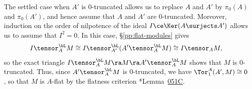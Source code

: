 The settled case when $A'$ is $0$-truncated allows us to replace $A$ and $A'$ by $\pi_0(A)$ and $\pi_0(A')$, and hence assume that $A$ and $A'$ are $0$-truncated. Moreover, induction on the order of nilpotence of the ideal $I \ce \Ker(A \surjects A')$ allows us to assume that $I^2 = 0$. In this case, \S\ref{pp:flat-modules} gives
\[
I \tensor^\bL_A M \cong I \tensor^\bL_{A'} (A' \tensor^\bL_A M) \cong I \tensor_A M,
\]
so the exact triangle $I \tensor^\bL_A M \ra M \ra A' \tensor^\bL_A M$ shows that $M$ is $0$-truncated. Thus, since $A' \tensor^\bL_A M$ is $0$-truncated, we have $\Tor_1^A(A', M) \cong 0$, so that $M$ is $A$-flat by the  flatness criterion \cite{SP}*{Lemma~\href{https://stacks.math.columbia.edu/tag/051C}{051C}}.
\epf






